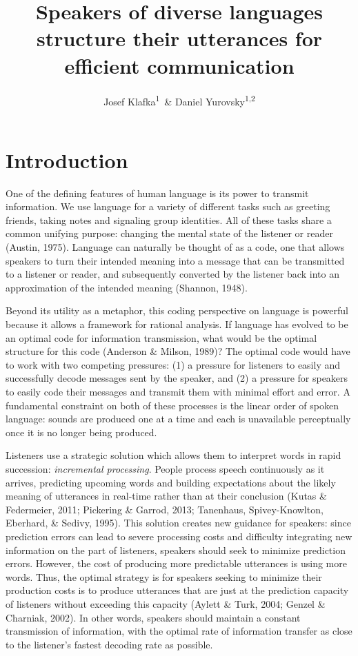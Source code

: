 \documentclass[man,floatsintext]{apa6}
\title{Speakers of diverse languages structure their utterances for efficient communication}
\author{Josef Klafka\textsuperscript{1}~\& Daniel Yurovsky\textsuperscript{1,2}}
\date{}
\affiliation{
\vspace{0.5cm}
\textsuperscript{1} Carnegie Mellon University\\\textsuperscript{2} University of Chicago}
\begin{document}
\maketitle

\hypertarget{introduction}{%
\section{Introduction}\label{introduction}}

One of the defining features of human language is its power to transmit information. We use language for a variety of different tasks such as greeting friends, taking notes and signaling group identities. All of these tasks share a common unifying purpose: changing the mental state of the listener or reader (Austin, 1975). Language can naturally be thought of as a code, one that allows speakers to turn their intended meaning into a message that can be transmitted to a listener or reader, and subsequently converted by the listener back into an approximation of the intended meaning (Shannon, 1948).

Beyond its utility as a metaphor, this coding perspective on language is powerful because it allows a framework for rational analysis. If language has evolved to be an optimal code for information transmission, what would be the optimal structure for this code (Anderson \& Milson, 1989)? The optimal code would have to work with two competing pressures: (1) a pressure for listeners to easily and successfully decode messages sent by the speaker, and (2) a pressure for speakers to easily code their messages and transmit them with minimal effort and error. A fundamental constraint on both of these processes is the linear order of spoken language: sounds are produced one at a time and each is unavailable perceptually once it is no longer being produced.

Listeners use a strategic solution which allows them to interpret words in rapid succession: \emph{incremental processing}. People process speech continuously as it arrives, predicting upcoming words and building expectations about the likely meaning of utterances in real-time rather than at their conclusion (Kutas \& Federmeier, 2011; Pickering \& Garrod, 2013; Tanenhaus, Spivey-Knowlton, Eberhard, \& Sedivy, 1995). This solution creates new guidance for speakers: since prediction errors can lead to severe processing costs and difficulty integrating new information on the part of listeners, speakers should seek to minimize prediction errors. However, the cost of producing more predictable utterances is using more words. Thus, the optimal strategy is for speakers seeking to minimize their production costs is to produce utterances that are just at the prediction capacity of listeners without exceeding this capacity (Aylett \& Turk, 2004; Genzel \& Charniak, 2002). In other words, speakers should maintain a constant transmission of information, with the optimal rate of information transfer as close to the listener's fastest decoding rate as possible.
\end{document}
